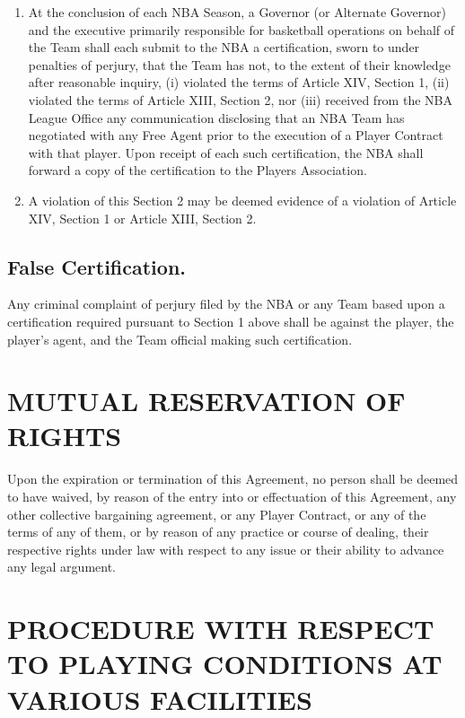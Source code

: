 \documentclass[
]{book}
\providecommand{\tightlist}{%
  \setlength{\itemsep}{0pt}\setlength{\parskip}{0pt}}
\begin{document}
\begin{enumerate}
\def\labelenumi{(\alph{enumi})}
\tightlist
\item
  At the conclusion of each NBA Season, a Governor (or Alternate Governor) and the executive primarily responsible for basketball operations on behalf of the Team shall each submit to the NBA a certification, sworn to under penalties of perjury, that the Team has not, to the extent of their knowledge after reasonable inquiry, (i) violated the terms of Article XIV, Section 1, (ii) violated the terms of Article XIII, Section 2, nor (iii) received from the NBA League Office any communication disclosing that an NBA Team has negotiated with any Free Agent prior to the execution of a Player Contract with that player. Upon receipt of each such certification, the NBA shall forward a copy of the certification to the Players Association.
\item
  A violation of this Section 2 may be deemed evidence of a violation of Article XIV, Section 1 or Article XIII, Section 2.
\end{enumerate}

\hypertarget{false-certification.}{%
\section{False Certification.}\label{false-certification.}}

Any criminal complaint of perjury filed by the NBA or any Team based upon a certification required pursuant to Section 1 above shall be against the player, the player's agent, and the Team official making such certification.

\hypertarget{mutual-reservation-of-rights}{%
\chapter{MUTUAL RESERVATION OF RIGHTS}\label{mutual-reservation-of-rights}}

Upon the expiration or termination of this Agreement, no person shall be deemed to have waived, by reason of the entry into or effectuation of this Agreement, any other collective bargaining agreement, or any Player Contract, or any of the terms of any of them, or by reason of any practice or course of dealing, their respective rights under law with respect to any issue or their ability to advance any legal argument.

\hypertarget{procedure-with-respect-to-playing-conditions-at-various-facilities}{%
\chapter{PROCEDURE WITH RESPECT TO PLAYING CONDITIONS AT VARIOUS FACILITIES}\label{procedure-with-respect-to-playing-conditions-at-various-facilities}}
\end{document}

